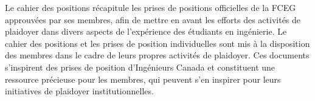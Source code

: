 Le cahier des positions récapitule les prises de positions officielles de la FCEG approuvées par ses membres, afin de mettre en avant les efforts des activités de plaidoyer dans divers aspects de l'expérience des étudiants en ingénierie. Le cahier des positions et les prises de position individuelles sont mis à la disposition des membres dans le cadre de leurs propres activités de plaidoyer. Ces documents s'inspirent des prises de position d'Ingénieurs Canada et constituent une ressource précieuse pour les membres, qui peuvent s'en inspirer pour leurs initiatives de plaidoyer institutionnelles.

\newpage
